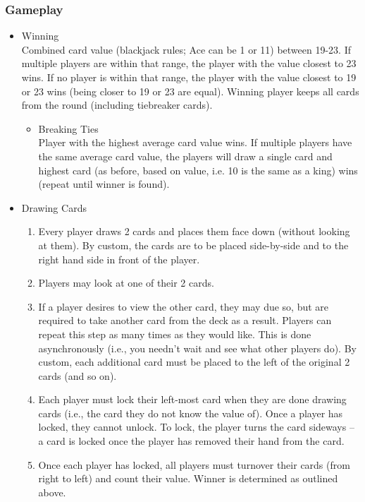 \documentclass[11pt]{article}
\begin{document}
\subsubsection{Gameplay}
\label{sec-1-2-2}
\begin{itemize}

\item Winning\\
\label{sec-1-2-2-1}%
Combined card value (blackjack rules; Ace can be 1 or 11) between
19-23. If multiple players are within that range, the player with the
value closest to 23 wins. If no player is within that range, the
player with the value closest to 19 or 23 wins (being closer to 19 or
23 are equal). Winning player keeps all cards from the round
(including tiebreaker cards). 

\begin{itemize}

\item Breaking Ties\\
\label{sec-1-2-2-1-1}%
Player with the highest average card value wins. If multiple players
have the same average card value, the players will draw a single card
and highest card (as before, based on value, i.e. 10 is the same as a
king) wins (repeat until winner is found).

\end{itemize} %

\item Drawing Cards
\label{sec-1-2-2-2}%
\begin{enumerate}
\item Every player draws 2 cards and places them face down (without
   looking at them). By custom, the cards are to be placed
   side-by-side and to the right hand side in front of the player.
\item Players may look at one of their 2 cards.
\item If a player desires to view the other card, they may due so, but
   are required to take another card from the deck as a result.
   Players can repeat this step as many times as they would like. This
   is done asynchronously (i.e., you needn't wait and see what other
   players do). By custom, each additional card must be placed to the
   left of the original 2 cards (and so on).
\item Each player must lock their left-most card when they are done
   drawing cards (i.e., the card they do not know the value of). Once
   a player has locked, they cannot unlock. To lock, the player turns
   the card sideways -- a card is locked once the player has removed
   their hand from the card.
\item Once each player has locked, all players must turnover their cards
   (from right to left) and count their value. Winner is determined as
   outlined above.
\end{enumerate}


\end{itemize} %
\end{document}
